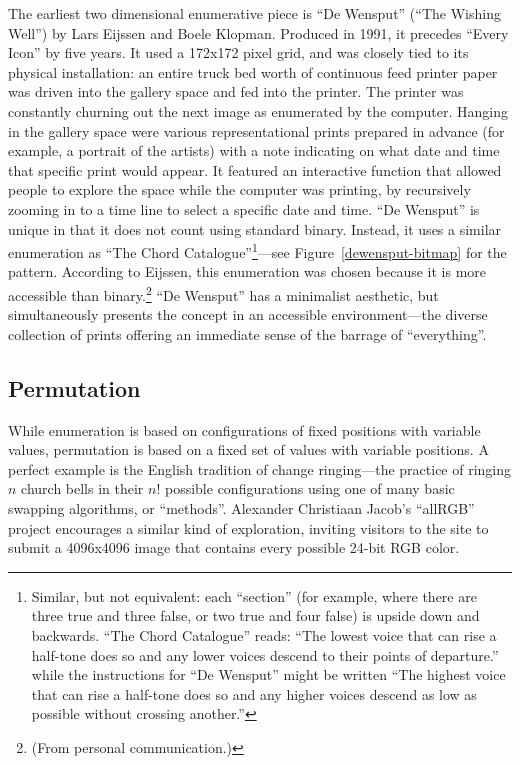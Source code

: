 \documentclass{thesis}
\begin{document}
The earliest two dimensional enumerative piece is ``De Wensput'' (``The Wishing Well'') by Lars Eijssen and Boele Klopman.\cite{remko_scha_every_2001} Produced in 1991, it precedes ``Every Icon'' by five years. It used a 172x172 pixel grid, and was closely tied to its physical installation: an entire truck bed worth of continuous feed printer paper was driven into the gallery space and fed into the printer. The printer was constantly churning out the next image as enumerated by the computer. Hanging in the gallery space were various representational prints prepared in advance (for example, a portrait of the artists) with a note indicating on what date and time that specific print would appear. It featured an interactive function that allowed people to explore the space while the computer was printing, by recursively zooming in to a time line to select a specific date and time. ``De Wensput'' is unique in that it does not count using standard binary. Instead, it uses a similar enumeration as ``The Chord Catalogue''\footnote{Similar, but not equivalent: each ``section'' (for example, where there are three true and three false, or two true and four false) is upside down and backwards. ``The Chord Catalogue'' reads: ``The lowest voice that can rise a half-tone does so and any lower voices descend to their points of departure.'' while the instructions for ``De Wensput'' might be written ``The highest voice that can rise a half-tone does so and any higher voices descend as low as possible without crossing another.''}---see Figure~\ref{dewensput-bitmap} for the pattern. According to Eijssen, this enumeration was chosen because it is more accessible than binary.\footnote{(From personal communication.)} ``De Wensput'' has a minimalist aesthetic, but simultaneously presents the concept in an accessible environment---the diverse collection of prints offering an immediate sense of the barrage of ``everything''.

\subsection{Permutation}

While enumeration is based on configurations of fixed positions with variable values, permutation is based on a fixed set of values with variable positions. A perfect example is the English tradition of change ringing---the practice of ringing $n$ church bells in their $n!$ possible configurations using one of many basic swapping algorithms, or ``methods''. Alexander Christiaan Jacob's ``allRGB''\cite{alexander_christiaan_jacob_allrgb_2008} project encourages a similar kind of exploration, inviting visitors to the site to submit a 4096x4096 image that contains every possible 24-bit RGB color.
\end{document}
